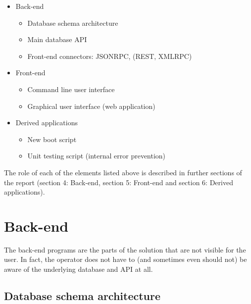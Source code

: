 \documentclass{customization}
\begin{document}
\begin{itemize}
    \item Back-end 
        \begin{itemize}
            \item Database schema architecture
            \item Main database API
            \item Front-end connectors: JSONRPC, (REST, XMLRPC)
        \end{itemize}
    \item Front-end
        \begin{itemize}
            \item Command line user interface
            \item Graphical user interface (web application)
        \end{itemize}
    \item Derived applications
        \begin{itemize}
            \item New boot script
            \item Unit testing script (internal error prevention)
        \end{itemize}
\end{itemize}

\vspace{1cm}
\noindent
The role of each of the elements listed above is described in further sections of the report (section 4: Back-end, section 5: Front-end and section 6: Derived applications).


\newpage
\section{Back-end}
\hspace{0.6cm}

The back-end programs are the parts of the solution that are not visible for the user. In fact, the operator does not have to (and sometimes even should not) be aware of the underlying database and API at all.

\subsection{Database schema architecture}
\hspace{0.6cm}
\end{document}
